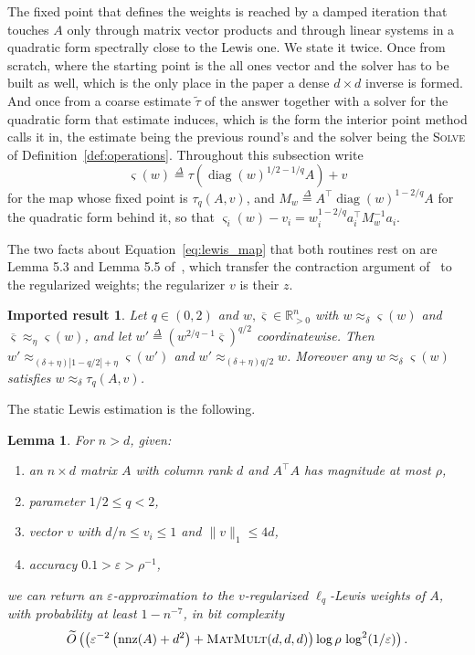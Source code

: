 \documentclass[11pt]{article}
\newtheorem{lemma}{Lemma}[section]
\newtheorem{importedresult}{Imported result}[section]
\newcommand{\R}{\mathbb R}
\newcommand{\diag}{\operatorname{diag}}
\newcommand{\nnz}{\operatorname{nnz}}
\newcommand{\MM}{\textsc{MatMult}}
\renewcommand{\O}{\widetilde O}
\newcommand{\tautil}{\widetilde{\tau}}
\newcommand{\defeq}{\stackrel{\Delta}{=}}
\begin{document}
The fixed point that defines the weights is reached by a damped iteration that
touches $A$ only through matrix vector products and through linear systems in a
quadratic form spectrally close to the Lewis one.
We state it twice.
Once from scratch, where the starting point is the all ones vector and the
solver has to be built as well, which is the only place in the paper a dense
$d \times d$ inverse is formed.
And once from a coarse estimate $\tautil$ of the answer together with a solver
for the quadratic form that estimate induces, which is the form the interior
point method calls it in, the estimate being the previous round's and the solver
being the \textsc{Solve} of Definition~\ref{def:operations}.
Throughout this subsection write
\begin{equation}
\label{eq:lewis_map}
\varsigma(w)
\defeq
\tau\left( \diag(w)^{1/2 - 1/q} A \right) + v
\end{equation}
for the map whose fixed point is $\tau_{q}(A, v)$, and
$M_{w} \defeq A^{\top} \diag(w)^{1 - 2/q} A$ for the quadratic form behind it,
so that $\varsigma_i(w) - v_i = w_i^{1 - 2/q} a_i^{\top} M_{w}^{-1} a_i$.

The two facts about Equation~\eqref{eq:lewis_map} that both routines rest on are
Lemma 5.3 and Lemma 5.5 of~\cite{BLLSSSW21},
which transfer the contraction argument of~\cite{CP15} to the
regularized weights; the regularizer $v$ is their
$z$.

\begin{importedresult}
\label{imp:lewis_contraction}
Let $q \in (0, 2)$ and
$w, \overline{\varsigma} \in \R^{n}_{> 0}$ with
$w \approx_{\delta} \varsigma(w)$ and
$\overline{\varsigma} \approx_{\eta} \varsigma(w)$, and let
$w' \defeq (w^{2/q - 1} \overline{\varsigma})^{q/2}$ coordinatewise.
Then $w' \approx_{(\delta + \eta)|1 - q/2| + \eta} \varsigma(w')$ and
$w' \approx_{(\delta + \eta) q/2} w$.
Moreover any $w \approx_{\delta} \varsigma(w)$ satisfies
$w \approx_{\delta} \tau_{q}(A, v)$.
\end{importedresult}

The static Lewis estimation is the following.

\begin{lemma}
\label{lem:lewis_static}
For $n > d$, given:
\begin{enumerate}
\item \label{itm:lewis_static:1} an $n \times d$ matrix
  $A$ with column rank
  $d$ and
  $A^{\top} A$ has magnitude at most
  $\rho$,
\item \label{itm:lewis_static:2} parameter $1/2 \leq q < 2$,
\item \label{itm:lewis_static:3} vector $v$ with
  $d/n \le v_i \le 1$ and
  $\|v\|_1\le 4d$,
\item \label{itm:lewis_static:4} accuracy $0.1 > \varepsilon > \rho^{-1}$,
\end{enumerate}
we can return an $\varepsilon$-approximation to the
$v$-regularized
$\ell_{q}$-Lewis weights of
$A$, with probability at least
$1 - n^{-7}$, in bit complexity
\[
\O\left( \left( \varepsilon^{-2} \left( \nnz(A) + d^{2} \right)
+ \MM(d, d, d) \right) \log \rho \, \log^{2}(1 / \varepsilon) \right) .
\]
\end{lemma}
\end{document}
